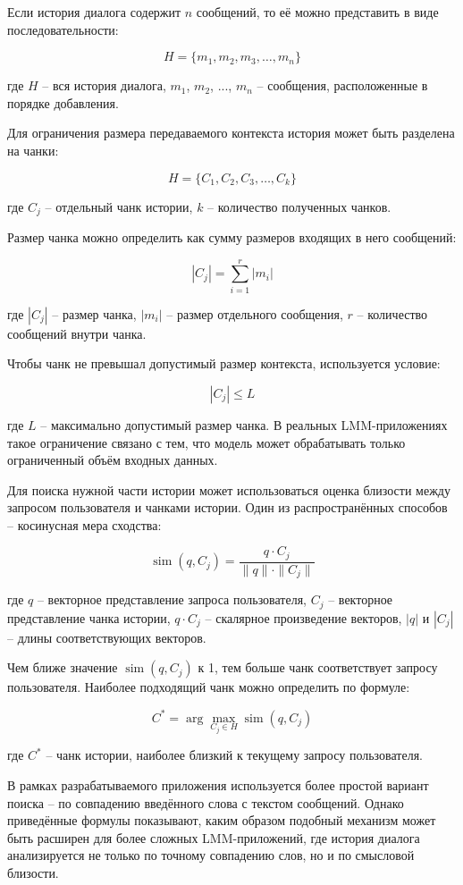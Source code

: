 \documentclass[12pt,a4paper]{article}
\begin{document}
Если история диалога содержит $n$ сообщений, то её можно представить в виде последовательности:

\[H = \{m_1, m_2, m_3, \ldots, m_n\}\]

где $H$ -- вся история диалога, $m_1$, $m_2$, ..., $m_n$ -- сообщения, расположенные в порядке добавления.

Для ограничения размера передаваемого контекста история может быть разделена на чанки:

\[H = \{C_1, C_2, C_3, \ldots, C_k\}\]

где $C_j$ -- отдельный чанк истории, $k$ -- количество полученных чанков.

Размер чанка можно определить как сумму размеров входящих в него сообщений:

\[|C_j| = \sum_{i=1}^{r} |m_i|\]

где $|C_j|$ -- размер чанка, $|m_i|$ -- размер отдельного сообщения, $r$ -- количество сообщений внутри чанка.

Чтобы чанк не превышал допустимый размер контекста, используется условие:

\[|C_j| \leq L\]

где $L$ -- максимально допустимый размер чанка. В реальных LMM-приложениях такое ограничение связано с тем, что модель может обрабатывать только ограниченный объём входных данных.

Для поиска нужной части истории может использоваться оценка близости между запросом пользователя и чанками истории. Один из распространённых способов -- косинусная мера сходства:

\[\operatorname{sim}(q, C_j) = \frac{q \cdot C_j}{\|q\| \cdot \|C_j\|}\]

где $q$ -- векторное представление запроса пользователя, $C_j$ -- векторное представление чанка истории, $q \cdot C_j$ -- скалярное произведение векторов, $|q|$ и $|C_j|$ -- длины соответствующих векторов.

Чем ближе значение $\operatorname{sim}(q, C_j)$ к 1, тем больше чанк соответствует запросу пользователя. Наиболее подходящий чанк можно определить по формуле:

\[C^* = \arg\max_{C_j \in H} \operatorname{sim}(q, C_j)\]

где $C^*$ -- чанк истории, наиболее близкий к текущему запросу пользователя.

В рамках разрабатываемого приложения используется более простой вариант поиска -- по совпадению введённого слова с текстом сообщений. Однако приведённые формулы показывают, каким образом подобный механизм может быть расширен для более сложных LMM-приложений, где история диалога анализируется не только по точному совпадению слов, но и по смысловой близости.
\end{document}
